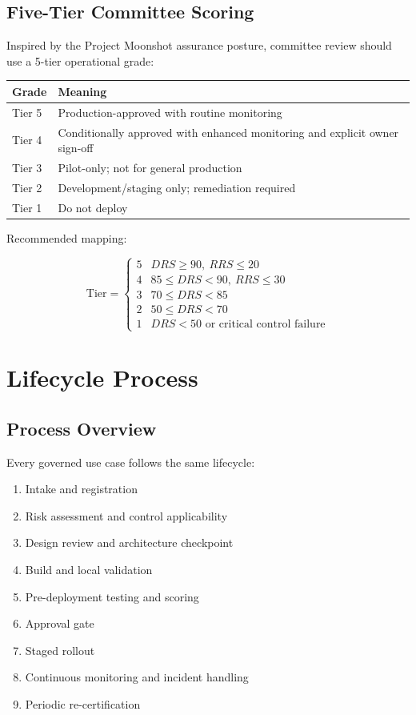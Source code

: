 \documentclass[11pt,a4paper]{article}
\begin{document}
\subsection{Five-Tier Committee Scoring}

Inspired by the Project Moonshot assurance posture, committee review should use a 5-tier operational grade:

\begin{center}
\begin{tabular}{ll}
\toprule
\textbf{Grade} & \textbf{Meaning} \\
\midrule
Tier 5 & Production-approved with routine monitoring \\
Tier 4 & Conditionally approved with enhanced monitoring and explicit owner sign-off \\
Tier 3 & Pilot-only; not for general production \\
Tier 2 & Development/staging only; remediation required \\
Tier 1 & Do not deploy \\
\bottomrule
\end{tabular}
\end{center}

Recommended mapping:

\[
\text{Tier} =
\begin{cases}
5 & DRS \ge 90,\ RRS \le 20 \\
4 & 85 \le DRS < 90,\ RRS \le 30 \\
3 & 70 \le DRS < 85 \\
2 & 50 \le DRS < 70 \\
1 & DRS < 50 \text{ or critical control failure}
\end{cases}
\]

\section{Lifecycle Process}

\subsection{Process Overview}

Every governed use case follows the same lifecycle:

\begin{enumerate}[nosep]
    \item Intake and registration
    \item Risk assessment and control applicability
    \item Design review and architecture checkpoint
    \item Build and local validation
    \item Pre-deployment testing and scoring
    \item Approval gate
    \item Staged rollout
    \item Continuous monitoring and incident handling
    \item Periodic re-certification
\end{enumerate}
\end{document}
